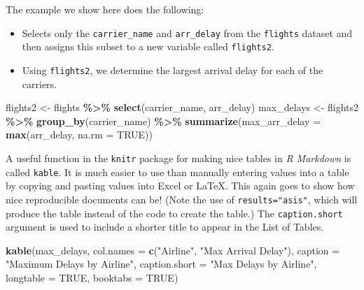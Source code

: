 \documentclass[12pt,twoside]{reedthesis}
\newenvironment{Shaded}{\begin{snugshade}}{\end{snugshade}}
\newcommand{\AttributeTok}[1]{\textcolor[rgb]{0.13,0.29,0.53}{#1}}
\newcommand{\ConstantTok}[1]{\textcolor[rgb]{0.56,0.35,0.01}{#1}}
\newcommand{\FunctionTok}[1]{\textcolor[rgb]{0.13,0.29,0.53}{\textbf{#1}}}
\newcommand{\NormalTok}[1]{#1}
\newcommand{\OtherTok}[1]{\textcolor[rgb]{0.56,0.35,0.01}{#1}}
\newcommand{\SpecialCharTok}[1]{\textcolor[rgb]{0.81,0.36,0.00}{\textbf{#1}}}
\newcommand{\StringTok}[1]{\textcolor[rgb]{0.31,0.60,0.02}{#1}}
\begin{document}
The example we show here does the following:
\begin{itemize}
\item
  Selects only the \texttt{carrier\_name} and \texttt{arr\_delay} from the \texttt{flights} dataset and then assigns this subset to a new variable called \texttt{flights2}.
\item
  Using \texttt{flights2}, we determine the largest arrival delay for each of the carriers.
\end{itemize}
\begin{Shaded}
\begin{Highlighting}[]
\NormalTok{flights2 }\OtherTok{\textless{}{-}}\NormalTok{ flights }\SpecialCharTok{\%\textgreater{}\%} 
  \FunctionTok{select}\NormalTok{(carrier\_name, arr\_delay)}
\NormalTok{max\_delays }\OtherTok{\textless{}{-}}\NormalTok{ flights2 }\SpecialCharTok{\%\textgreater{}\%} 
  \FunctionTok{group\_by}\NormalTok{(carrier\_name) }\SpecialCharTok{\%\textgreater{}\%}
  \FunctionTok{summarize}\NormalTok{(}\AttributeTok{max\_arr\_delay =} \FunctionTok{max}\NormalTok{(arr\_delay, }\AttributeTok{na.rm =} \ConstantTok{TRUE}\NormalTok{))}
\end{Highlighting}
\end{Shaded}
A useful function in the \texttt{knitr} package for making nice tables in \emph{R Markdown} is called \texttt{kable}. It is much easier to use than manually entering values into a table by copying and pasting values into Excel or LaTeX. This again goes to show how nice reproducible documents can be! (Note the use of \texttt{results="asis"}, which will produce the table instead of the code to create the table.) The \texttt{caption.short} argument is used to include a shorter title to appear in the List of Tables.
\begin{Shaded}
\begin{Highlighting}[]
\FunctionTok{kable}\NormalTok{(max\_delays, }
      \AttributeTok{col.names =} \FunctionTok{c}\NormalTok{(}\StringTok{"Airline"}\NormalTok{, }\StringTok{"Max Arrival Delay"}\NormalTok{),}
      \AttributeTok{caption =} \StringTok{"Maximum Delays by Airline"}\NormalTok{,}
      \AttributeTok{caption.short =} \StringTok{"Max Delays by Airline"}\NormalTok{,}
      \AttributeTok{longtable =} \ConstantTok{TRUE}\NormalTok{,}
      \AttributeTok{booktabs =} \ConstantTok{TRUE}\NormalTok{)}
\end{Highlighting}
\end{Shaded}
\end{document}
